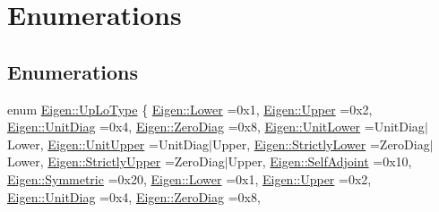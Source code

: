 \hypertarget{group__enums}{}\section{Enumerations}
\label{group__enums}
\subsection*{Enumerations}
\begin{DoxyCompactItemize}
\item 
enum \hyperlink{group__enums_ga39e3366ff5554d731e7dc8bb642f83cd}{Eigen\+::\+Up\+Lo\+Type} \{ \newline
\hyperlink{group__enums_gga39e3366ff5554d731e7dc8bb642f83cda891792b8ed394f7607ab16dd716f60e6}{Eigen\+::\+Lower} =0x1, 
\hyperlink{group__enums_gga39e3366ff5554d731e7dc8bb642f83cda6bcb58be3b8b8ec84859ce0c5ac0aaec}{Eigen\+::\+Upper} =0x2, 
\hyperlink{group__enums_gga39e3366ff5554d731e7dc8bb642f83cdaddb72f888ac85d5a1c52333e54f9374b}{Eigen\+::\+Unit\+Diag} =0x4, 
\hyperlink{group__enums_gga39e3366ff5554d731e7dc8bb642f83cda884ff7240392e85aa6e4b3c957e36483}{Eigen\+::\+Zero\+Diag} =0x8, 
\newline
\hyperlink{group__enums_gga39e3366ff5554d731e7dc8bb642f83cda8155cfdfde9e75e7144dff0393d17181}{Eigen\+::\+Unit\+Lower} =Unit\+Diag$\vert$\+Lower, 
\hyperlink{group__enums_gga39e3366ff5554d731e7dc8bb642f83cda8b0b63ff46dcd7377b59df14e0562fc1}{Eigen\+::\+Unit\+Upper} =Unit\+Diag$\vert$\+Upper, 
\hyperlink{group__enums_gga39e3366ff5554d731e7dc8bb642f83cda00aa79c8865ada1584c4d57bcd93299f}{Eigen\+::\+Strictly\+Lower} =Zero\+Diag$\vert$\+Lower, 
\hyperlink{group__enums_gga39e3366ff5554d731e7dc8bb642f83cdae38aad7d66fecfb213fce453edff4c7a}{Eigen\+::\+Strictly\+Upper} =Zero\+Diag$\vert$\+Upper, 
\newline
\hyperlink{group__enums_gga39e3366ff5554d731e7dc8bb642f83cda2491fc6765056421f504eb7e16083e8f}{Eigen\+::\+Self\+Adjoint} =0x10, 
\hyperlink{group__enums_gga39e3366ff5554d731e7dc8bb642f83cda7d30fb969ef6b763c098f0015108cef4}{Eigen\+::\+Symmetric} =0x20, 
\hyperlink{group__enums_gga39e3366ff5554d731e7dc8bb642f83cda891792b8ed394f7607ab16dd716f60e6}{Eigen\+::\+Lower} =0x1, 
\hyperlink{group__enums_gga39e3366ff5554d731e7dc8bb642f83cda6bcb58be3b8b8ec84859ce0c5ac0aaec}{Eigen\+::\+Upper} =0x2, 
\newline
\hyperlink{group__enums_gga39e3366ff5554d731e7dc8bb642f83cdaddb72f888ac85d5a1c52333e54f9374b}{Eigen\+::\+Unit\+Diag} =0x4, 
\hyperlink{group__enums_gga39e3366ff5554d731e7dc8bb642f83cda884ff7240392e85aa6e4b3c957e36483}{Eigen\+::\+Zero\+Diag} =0x8, 

\end{DoxyCompactItemize}
